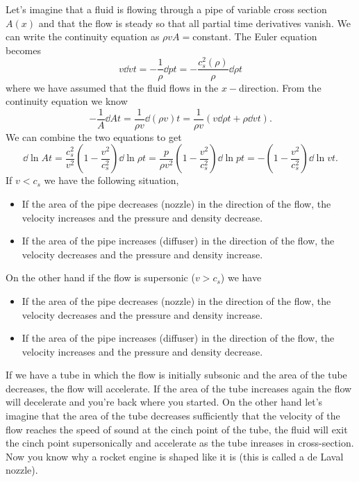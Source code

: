 Let's imagine that a fluid is flowing through a pipe of variable cross
section $A(x)$ and that the flow is steady so that all partial time
derivatives vanish.  We can write the continuity equation as $\rho v
A=$constant.  The Euler equation becomes
\begin{equation}
v \dd{v}{t} = - \frac{1}{\rho} \dd{p}{t} = -\frac{c_s^2(\rho)}{\rho} \dd{\rho}{t}
\label{eq:664}
\end{equation}
where we have assumed that the fluid flows in the $x-$direction.  From
the continuity equation we know
\begin{equation}
-\frac{1}{A} \dd{A}{t} = \frac{1}{\rho v} \dd{(\rho v)}{t} 
= \frac{1}{\rho v} \left ( v \dd{\rho}{t} + \rho \dd{v}{t}  \right ) .
\label{eq:665}
\end{equation}
We can combine the two equations to get
\begin{equation}
\dd{\ln A}{t} = \frac{c_s^2}{v^2} \left ( 1 -
\frac{v^2}{c_s^2} \right ) \dd{\ln \rho}{t} = \frac{p}{\rho v^2}  \left ( 1 -
\frac{v^2}{c_s^2} \right )\dd{\ln p}{t} = - \left ( 1 -
\frac{v^2}{c_s^2} \right ) \dd{\ln v}{t}.
\label{eq:deLaval}
\label{eq:666}
\end{equation}
If $v<c_s$ we have the following situation,
\begin{itemize}
\item If the area of the pipe decreases (nozzle) in the direction of
  the flow, the velocity increases and the pressure and density
  decrease.
\item If the area of the pipe increases (diffuser) in the direction 
  of the flow,  the velocity decreases and the pressure and density increase.
\end{itemize}
On the other hand if the flow is supersonic ($v>c_s$) we have
\begin{itemize}
\item If the area of the pipe decreases (nozzle) in the direction of
  the flow, the velocity decreases and the pressure and density
  increase.
\item If the area of the pipe increases (diffuser) in the direction 
  of the flow,  the velocity increases and the pressure and density 
  decrease.
\end{itemize}

If we have a tube in which the flow is initially subsonic and the area
of the tube decreases, the flow will accelerate.  If the area of the
tube increases again the flow will decelerate and you're back where
you started.   On the other hand let's imagine that the area of the
tube decreases sufficiently that the velocity of the flow reaches the
speed of sound at the cinch point of the tube, the fluid will exit the
cinch point supersonically and accelerate as the tube inreases in
cross-section.   Now you know why a rocket engine is shaped like it is
(this is called a de Laval nozzle).


